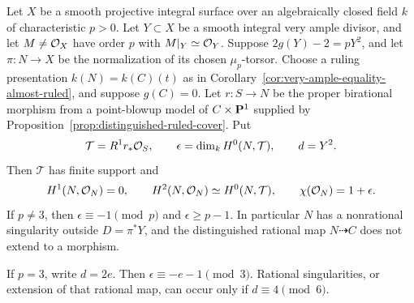 \begin{proposition}\label{prop:genus-zero-equality-defect}
Let $X$ be a smooth projective integral surface over an algebraically
closed field $k$ of characteristic $p>0$.
Let $Y\subset X$ be a smooth integral very ample divisor, and let
$M\ne\mathcal O_X$ have order $p$ with $M|_Y\simeq\mathcal O_Y$.
Suppose $2g(Y)-2=pY^2$, and let $\pi:N\to X$ be the normalization
of its chosen $\mu_p$-torsor.
Choose a ruling presentation
$k(N)=k(C)(t)$ as in
Corollary~\ref{cor:very-ample-equality-almost-ruled}, and suppose
$g(C)=0$.
Let $r:S\to N$ be the proper birational morphism from a point-blowup
model of $C\times\mathbf P^1$ supplied by
Proposition~\ref{prop:distinguished-ruled-cover}. Put
\[
 \mathcal T=R^1r_*\mathcal O_S,\qquad
 \epsilon=\dim_kH^0(N,\mathcal T),\qquad d=Y^2.
\]
Then $\mathcal T$ has finite support and
\begin{equation}\label{eq:genus-zero-equality-defect}
 H^1(N,\mathcal O_N)=0,\qquad
 H^2(N,\mathcal O_N)\simeq H^0(N,\mathcal T),\qquad
 \chi(\mathcal O_N)=1+\epsilon.
\end{equation}
If $p\ne3$, then $\epsilon\equiv-1\pmod p$ and
$\epsilon\geq p-1$. In particular $N$ has a nonrational singularity
outside $D=\pi^*Y$, and the distinguished rational map
$N\dashrightarrow C$ does not extend to a morphism.

If $p=3$, write $d=2e$. Then $\epsilon\equiv-e-1\pmod3$.
Rational singularities, or extension of that rational map, can occur
only if $d\equiv4\pmod6$.
\end{proposition}

